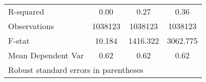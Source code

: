 {\begin{tabular}{l*{3}{c}}
\hline
R-squared           &        0.00         &        0.27         &        0.36         \\
Observations        &     1038123         &     1038123         &     1038123         \\
F-stat              &      10.184         &    1416.322         &    3062.775         \\
Mean Dependent Var  &        0.62         &        0.62         &        0.62         \\
\hline\hline
\multicolumn{4}{l}{\footnotesize Robust standard errors in parentheses}\\
\end{tabular}
}
